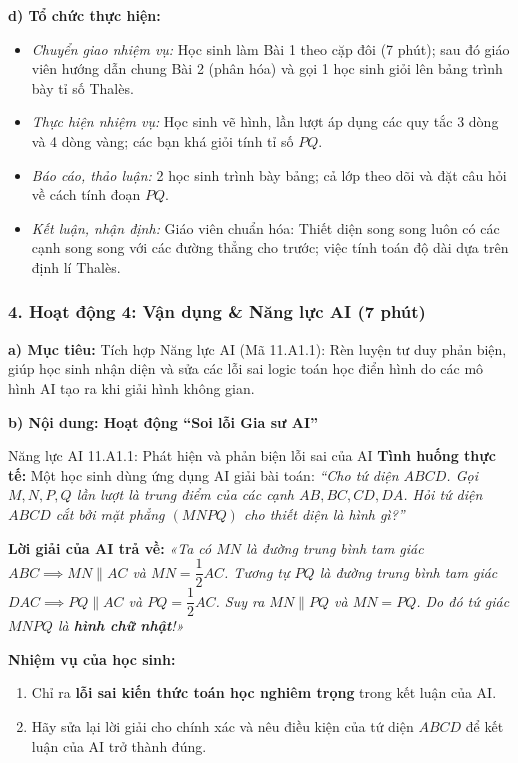 \documentclass[12pt, a4paper]{article}
\begin{document}
\noindent \textbf{d) Tổ chức thực hiện:}
\begin{itemize}[leftmargin=0.8cm]
    \item \textit{Chuyển giao nhiệm vụ:} Học sinh làm Bài 1 theo cặp đôi (7 phút); sau đó giáo viên hướng dẫn chung Bài 2 (phân hóa) và gọi 1 học sinh giỏi lên bảng trình bày tỉ số Thalès.
    \item \textit{Thực hiện nhiệm vụ:} Học sinh vẽ hình, lần lượt áp dụng các quy tắc 3 dòng và 4 dòng vàng; các bạn khá giỏi tính tỉ số $PQ$.
    \item \textit{Báo cáo, thảo luận:} 2 học sinh trình bày bảng; cả lớp theo dõi và đặt câu hỏi về cách tính đoạn $PQ$.
    \item \textit{Kết luận, nhận định:} Giáo viên chuẩn hóa: Thiết diện song song luôn có các cạnh song song với các đường thẳng cho trước; việc tính toán độ dài dựa trên định lí Thalès.
\end{itemize}

\subsubsection*{4. Hoạt động 4: Vận dụng & Năng lực AI (7 phút)}

\noindent \textbf{a) Mục tiêu:}
Tích hợp Năng lực AI (Mã 11.A1.1): Rèn luyện tư duy phản biện, giúp học sinh nhận diện và sửa các lỗi sai logic toán học điển hình do các mô hình AI tạo ra khi giải hình không gian.

\noindent \textbf{b) Nội dung: Hoạt động ``Soi lỗi Gia sư AI''}
\begin{aibox}{Năng lực AI 11.A1.1: Phát hiện và phản biện lỗi sai của AI}
\textbf{Tình huống thực tế:} Một học sinh dùng ứng dụng AI giải bài toán:
\textit{``Cho tứ diện $ABCD$. Gọi $M, N, P, Q$ lần lượt là trung điểm của các cạnh $AB, BC, CD, DA$. Hỏi tứ diện $ABCD$ cắt bởi mặt phẳng $(MNPQ)$ cho thiết diện là hình gì?''}

\textbf{Lời giải của AI trả về:}
\textit{«Ta có $MN$ là đường trung bình tam giác $ABC \implies MN \parallel AC$ và $MN = \dfrac{1}{2} AC$.
Tương tự $PQ$ là đường trung bình tam giác $DAC \implies PQ \parallel AC$ và $PQ = \dfrac{1}{2} AC$.
Suy ra $MN \parallel PQ$ và $MN = PQ$. Do đó tứ giác $MNPQ$ là \textbf{hình chữ nhật}!»}

\textbf{Nhiệm vụ của học sinh:}
\begin{enumerate}[leftmargin=0.6cm]
    \item Chỉ ra \textbf{lỗi sai kiến thức toán học nghiêm trọng} trong kết luận của AI.
    \item Hãy sửa lại lời giải cho chính xác và nêu điều kiện của tứ diện $ABCD$ để kết luận của AI trở thành đúng.
\end{enumerate}
\end{aibox}
\end{document}
